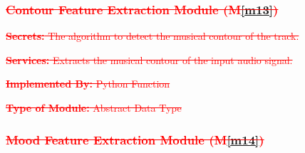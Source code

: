 \documentclass[12pt, titlepage]{article}
\newcommand{\mref}[1]{M\ref{#1}}
\begin{document}

\subsubsection{\textcolor{red}{\sout{Contour Feature Extraction Module (\mref{m13})}}}

\begin{description}
\item \textcolor{red}{\sout{\textbf{Secrets:} The algorithm to detect the musical contour of the track.}}
\item \textcolor{red}{\sout{\textbf{Services:} Extracts the musical contour of the input audio signal.}}
\item \textcolor{red}{\sout{\textbf{Implemented By:} Python Function}}
\item \textcolor{red}{\sout{\textbf{Type of Module:} Abstract Data Type}}
\end{description}


\subsubsection{\textcolor{red}{\sout{Mood Feature Extraction Module (\mref{m14})}}}
\end{document}

